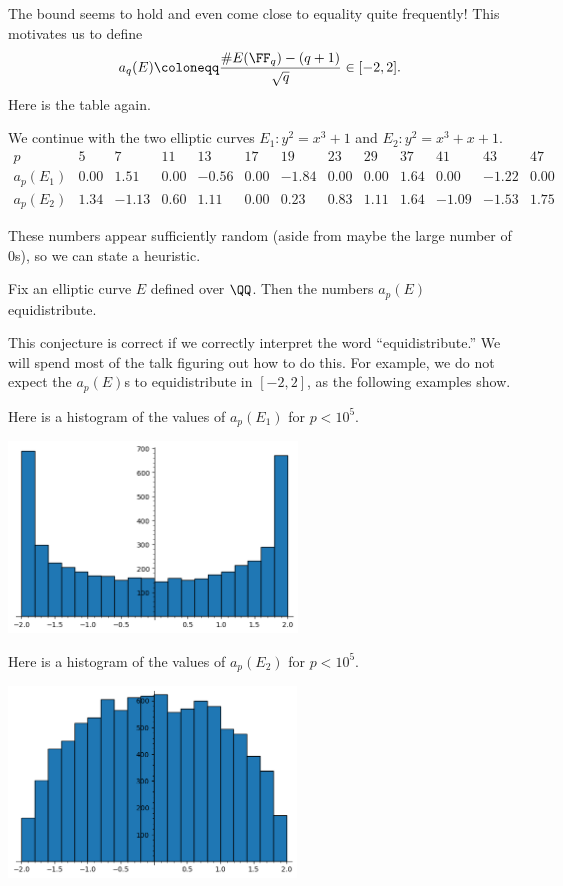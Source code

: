 \documentclass{article}
\begin{document}
The bound seems to hold and even come close to equality quite frequently! This motivates us to define
\[a_q(E)\coloneqq\frac{\#E(\FF_q)-(q+1)}{\sqrt q}\in[-2,2].\]
Here is the table again.
\begin{example}
	We continue with the two elliptic curves $E_1\colon y^2=x^3+1$ and $E_2\colon y^2=x^3+x+1$.
	\[\begin{array}{c|ccccccccccccccccc}
		p & 5 & 7 & 11 & 13 & 17 & 19 & 23 & 29 & 37 & 41 & 43 & 47 \\\hline
		a_p(E_1) & 0.00 & 1.51 & 0.00 & -0.56 & 0.00 & -1.84 & 0.00 & 0.00 & 1.64 & 0.00 & -1.22 & 0.00 \\
		a_p(E_2) & 1.34 & -1.13 & 0.60 & 1.11 & 0.00 & 0.23 & 0.83 & 1.11 & 1.64 & -1.09 & -1.53 & 1.75
	\end{array}\]
\end{example}
These numbers appear sufficiently random (aside from maybe the large number of $0$s), so we can state a heuristic.
\begin{conj}
	Fix an elliptic curve $E$ defined over $\QQ$. Then the numbers $a_p(E)$ equidistribute.
\end{conj}
This conjecture is correct if we correctly interpret the word ``equidistribute.'' We will spend most of the talk figuring out how to do this. For example, we do not expect the $a_p(E)$s to equidistribute in $[-2,2]$, as the following examples show.
\begin{example} \label{ex:sato-tate-distribution-e1}
	Here is a histogram of the values of $a_p(E_1)$ for $p<10^5$.
	\begin{center}
		\includegraphics[height=2in]{E1.png}
	\end{center}
\end{example}
\begin{example} \label{ex:sato-tate-distribution-e2}
	Here is a histogram of the values of $a_p(E_2)$ for $p<10^5$.
	\begin{center}
		\includegraphics[height=2in]{E2.png}
	\end{center}
\end{example}
\end{document}
